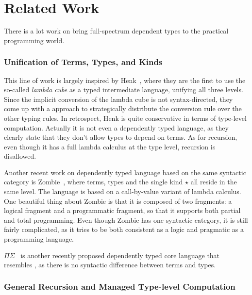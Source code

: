\section{Related Work}
\label{sec:related}

There is a lot work on bring full-spectrum dependent types to the practical programming world.

\subsubsection{Unification of Terms, Types, and Kinds}
This line of work is largely inspired by Henk~\cite{pts:henk}, where they are the first to use the so-called \emph{lambda cube} as a typed intermediate language, unifying all three levels. Since the implicit conversion of the lambda cube is not syntax-directed, they come up with a approach to strategically distribute the conversion rule over the other typing rules. In retrospect, Henk is quite conservative in terms of type-level computation. Actually it is not even a dependently typed language, as they clearly state that they don't allow types to depend on terms. As for recursion, even though it has a full lambda calculus at the type level, recursion is disallowed.

Another recent work on dependently typed language based on the same syntactic category is \textsf{Zombie}~\cite{zombie:popl14, zombie:thesis}, where terms, types and the single kind $\star$ all reside in the same level. The language is based on a call-by-value variant of lambda calculus. One beautiful thing about Zombie is that it is composed of two fragments: a logical fragment and a programmatic fragment, so that it supports both partial and total programming. Even though Zombie has one syntactic category, it is still fairly complicated, as it tries to be both consistent as a logic and pragmatic as a programming language.

$\Pi\Sigma$~\cite{dep:pisigma} is another recently proposed dependently typed core language that resembles \name, as there is no syntactic difference between terms and types.\bruno{}


\subsubsection{General Recursion and Managed Type-level Computation}

